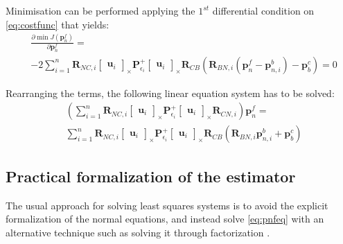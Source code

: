 Minimisation can be performed applying the $1^{st}$ differential condition on \eqref{eq:costfunc} that yields:
\begin{equation}
\begin{aligned}
    & \frac{\partial\min J(\mathbf{p}_n^f)}{\partial\mathbf{p}_n^f} = \\ & -2\sum_{i=1}^n\mathbf{R}_{NC, i}\begin{bmatrix}
        \mathbf{u}_i
    \end{bmatrix}_\times \mathbf{P}_{\epsilon_i}^{+}\begin{bmatrix}
        \mathbf{u}_i
    \end{bmatrix}_\times \mathbf{R}_{CB}(\mathbf{R}_{BN, i}(\mathbf{p}_n^f-\mathbf{p}_{n, i}^b)-\mathbf{p}_b^c) = 0
\end{aligned}
\end{equation}

Rearranging the terms, the following linear equation system has to be solved:
\begin{equation}
\begin{aligned}
    & \left( \sum_{i=1}^n \mathbf{R}_{NC, i}\begin{bmatrix}
        \mathbf{u}_i
    \end{bmatrix}_\times \mathbf{P}_{\epsilon_i}^{+} \begin{bmatrix}
        \mathbf{u}_i
    \end{bmatrix}_\times \mathbf{R}_{CN, i} \right)\mathbf{p}_n^f = \\ & \sum_{i=1}^n \mathbf{R}_{NC, i} \begin{bmatrix}
        \mathbf{u}_i
    \end{bmatrix}_\times \mathbf{P}_{\epsilon_i}^{+} \begin{bmatrix}
        \mathbf{u}_i
    \end{bmatrix}_\times
    \mathbf{R}_{CB}(\mathbf{R}_{BN, i} \mathbf{p}_{n, i}^b + \mathbf{p}_b^c)
\end{aligned}
\label{eq:pnfeq}
\end{equation}

\subsection{Practical formalization of the estimator}

The usual approach for solving least squares systems is to avoid the explicit formalization of the normal equations, and instead solve \eqref{eq:pnfeq} with an alternative technique such as solving it through factorization \cite{matrixcomputations}. 

